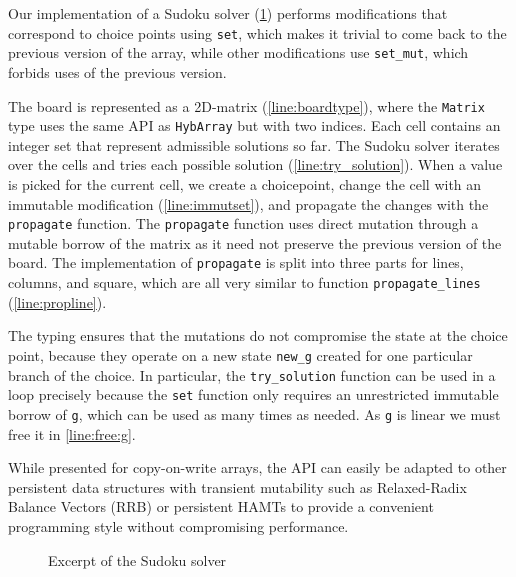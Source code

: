 Our implementation of a Sudoku solver (\cref{ex:sudoku}) performs
modifications that correspond to choice points using \lstinline/set/,
which makes it trivial to come back to the previous version
of the array, while other modifications use \lstinline/set_mut/, which
forbids uses of the previous version.

The board is represented as a 2D-matrix (\cref{line:boardtype}), where
the \lstinline/Matrix/ type uses the same API as \lstinline/HybArray/
but with two indices. 
Each cell contains an integer set that represent admissible solutions so far.
The Sudoku solver iterates over the cells and tries each possible solution (\cref{line:try_solution}).
When a value is picked for the current cell, we create a choicepoint,
change the cell with an immutable modification (\cref{line:immutset}), and propagate
the changes with the \lstinline/propagate/ function.
The \lstinline/propagate/ function uses direct mutation through a
mutable borrow of the matrix as it need not preserve the previous
version of the board.  
The implementation of \lstinline/propagate/ is split into three parts
for lines, columns, and square, which are all very similar to function
\lstinline/propagate_lines/ (\cref{line:propline}). 

The typing ensures that the mutations do not compromise the state at
the choice point, because they operate on a new state \lstinline/new_g/ created for one
particular branch of the choice.
In particular, the \lstinline/try_solution/ function can be used in a loop
precisely because the \lstinline/set/ function only requires an
unrestricted immutable borrow of \lstinline/g/, which can be used as
many times as needed.
As \lstinline/g/ is linear we must free it in \cref{line:free:g}.


While presented for copy-on-write arrays, the API
can easily be adapted to other persistent data structures with
transient mutability such as Relaxed-Radix Balance Vectors (RRB) \cite{DBLP:journals/pacmpl/Puente17}
or persistent HAMTs \cite{bagwell2001ideal,clojurehamt} to provide  a
convenient programming style without compromising performance.

\begin{figure}
  \centering
  \begin{minipage}[t]{0.45\linewidth}
    
  \end{minipage}\hfill
  \begin{minipage}[t]{0.54\linewidth}
    
  \end{minipage}
  \caption{Excerpt of the Sudoku solver}
  \label{ex:sudoku}
\end{figure}

